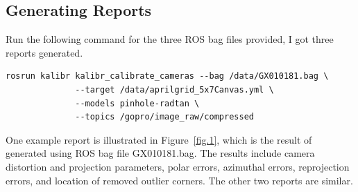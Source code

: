 \documentclass[11pt, oneside]{article}   	%
\begin{document}
\subsection{Generating Reports}
Run the following command for the three ROS bag files provided, I got three reports generated. 
\begin{verbatim}
rosrun kalibr kalibr_calibrate_cameras --bag /data/GX010181.bag \
              --target /data/aprilgrid_5x7Canvas.yml \
              --models pinhole-radtan \
              --topics /gopro/image_raw/compressed
\end{verbatim}

One example report is illustrated in Figure~\ref{fig.1}, which is the result of generated using ROS bag file GX010181.bag. The results include camera distortion and projection parameters, polar errors, azimuthal errors, reprojection errors, and location of removed outlier corners. The other two reports are similar.
\end{document}
